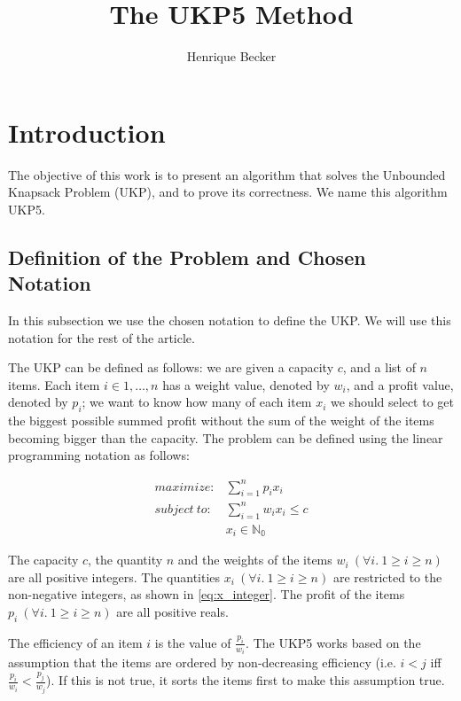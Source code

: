 \documentclass[12pt]{article}
\title{The UKP5 Method}
\author{Henrique Becker\inst{1}}
\begin{document}
 

\maketitle

\section{Introduction}

The objective of this work is to present an algorithm that solves the Unbounded Knapsack Problem (UKP), and to prove its correctness. We name this algorithm UKP5.

\subsection{Definition of the Problem and Chosen Notation}

In this subsection we use the chosen notation to define the UKP. We will use this notation for the rest of the article.

The UKP can be defined as follows: we are given a capacity \(c\), and a list of \(n\) items. Each item \(i \in {1, \ldots, n}\) has a weight value, denoted by \(w_i\), and a profit value, denoted by \(p_i\); we want to know how many of each item \(x_i\) we should select to get the biggest possible summed profit without the sum of the weight of the items becoming bigger than the capacity. The problem can be defined using the linear programming notation as follows:

\begin{align}
  maximize: &\sum_{i=1}^n p_i x_i\label{eq:objfun}\\
subject~to: &\sum_{i=1}^n w_i x_i \leq c\label{eq:capcons}\\
            &x_i \in \mathbb{N_0}\label{eq:x_integer}
\end{align}

The capacity \(c\), the quantity \(n\) and the weights of the items \(w_i~(\forall i.~1 \geq i \geq n)\) are all positive integers. The quantities \(x_i~(\forall i.~1 \geq i \geq n)\) are restricted to the non-negative integers, as shown in \eqref{eq:x_integer}. The profit of the items \(p_i~(\forall i.~1 \geq i \geq n)\) are all positive reals.

The efficiency of an item \(i\) is the value of \(\frac{p_i}{w_i}\). The UKP5 works based on the assumption that the items are ordered by non-decreasing efficiency (i.e. \(i < j\) iff \(\frac{p_i}{w_i} < \frac{p_j}{w_j}\)). If this is not true, it sorts the items first to make this assumption true.
\end{document}
